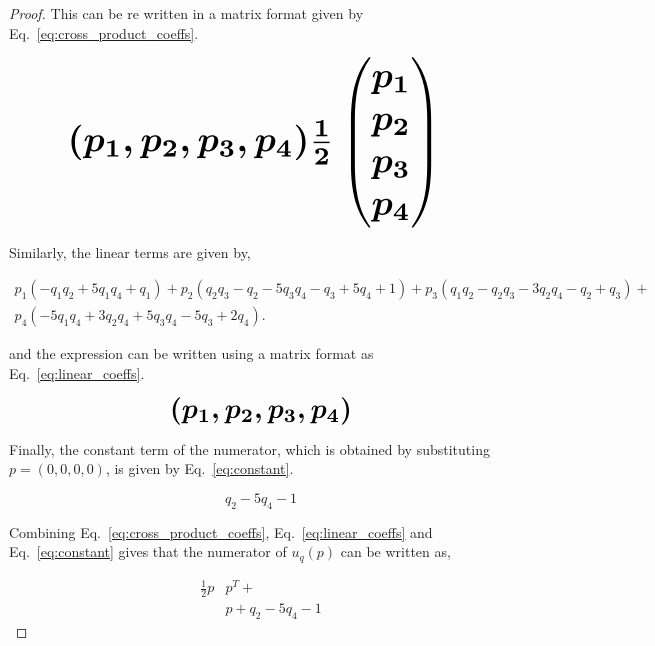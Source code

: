 \documentclass[10pt]{article}
\begin{document}
\begin{proof}
    This can be re written in a matrix format given by Eq.~\ref{eq:cross_product_coeffs}.
    
    \begin{equation}\label{eq:cross_product_coeffs}
        \resizebox{0.8\linewidth}{!}{\arraycolsep=2.5pt%
        \boldmath\( 
        (p_1, p_2, p_3, p_4) \frac{1}{2}  \begin{pmatrix} 
        p_1 \\
        p_2 \\
        p_3 \\
        p_4 \end{pmatrix}
        \) }
    \end{equation}
    
    Similarly, the linear terms are given by,
    
    \begingroup
    \footnotesize
    \begin{align*}
    p_{1} (- q_{1} q_{2} + 5 q_{1} q_{4} + q_{1}) + p_{2} (q_{2} q_{3} - q_{2} - 5 q_{3} q_{4} - q_{3} + 5 q_{4} + 1) + p_{3} (q_{1} q_{2} - q_{2} q_{3} - 3 q_{2} q_{4} - q_{2} + q_{3}) + \\
    p_{4} (- 5 q_{1} q_{4} + 3 q_{2} q_{4} + 5 q_{3} q_{4} - 5 q_{3} + 2 q_{4}).
    \end{align*}
    \endgroup
    
    and the expression can be written using a matrix format as Eq.~\ref{eq:linear_coeffs}.
    
    \begin{equation}\label{eq:linear_coeffs}
        \resizebox{0.38\linewidth}{!}{\arraycolsep=2.5pt%
        \boldmath\(
        (p_1, p_2, p_3, p_4) \)}
    \end{equation}
    
    Finally, the constant term of the numerator, which is obtained by substituting
    $p=(0, 0, 0, 0)$, is given by Eq.~\ref{eq:constant}.
    
    \begin{equation}\label{eq:constant}
    q_{2} - 5 q_{4} - 1
    \end{equation}
    
    Combining Eq.~\ref{eq:cross_product_coeffs}, Eq.~\ref{eq:linear_coeffs} and Eq.~\ref{eq:constant}
    gives that the numerator of \(u_q(p)\) can be written as,
    
    \begingroup
    \tiny\boldmath
    \begin{align*}
        \frac{1}{2}p &  p^T +  \\
        &  p + q_{2} - 5 q_{4} - 1
    \end{align*}
    \endgroup
    

\end{proof}
\end{document}
